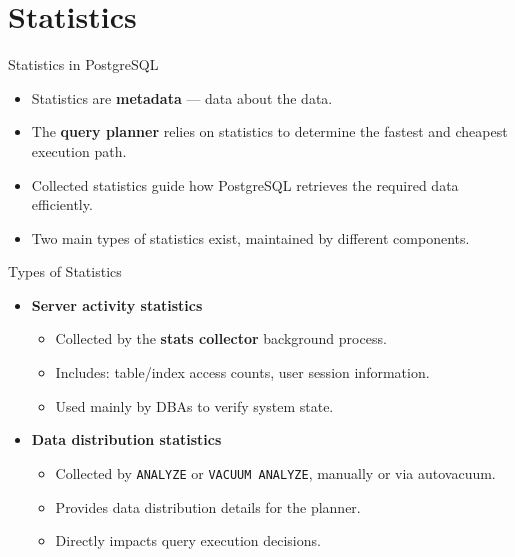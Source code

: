 \documentclass[aspectratio=169]{beamer}
\begin{document}
\section{Statistics}

\begin{frame}{Statistics in PostgreSQL}
  \begin{itemize}
    \item Statistics are \textbf{metadata} — data about the data.
    \item The \textbf{query planner} relies on statistics to determine the fastest and cheapest execution path.
    \item Collected statistics guide how PostgreSQL retrieves the required data efficiently.
    \item Two main types of statistics exist, maintained by different components.
  \end{itemize}
\end{frame}

\begin{frame}{Types of Statistics}
  \begin{itemize}
    \item \textbf{Server activity statistics}
      \begin{itemize}
        \item Collected by the \textbf{stats collector} background process.
        \item Includes: table/index access counts, user session information.
        \item Used mainly by DBAs to verify system state.
      \end{itemize}
    \vspace{0.3cm}
    \item \textbf{Data distribution statistics}
      \begin{itemize}
        \item Collected by \texttt{ANALYZE} or \texttt{VACUUM ANALYZE}, manually or via autovacuum.
        \item Provides data distribution details for the planner.
        \item Directly impacts query execution decisions.
      \end{itemize}
  \end{itemize}
\end{frame}
\end{document}
